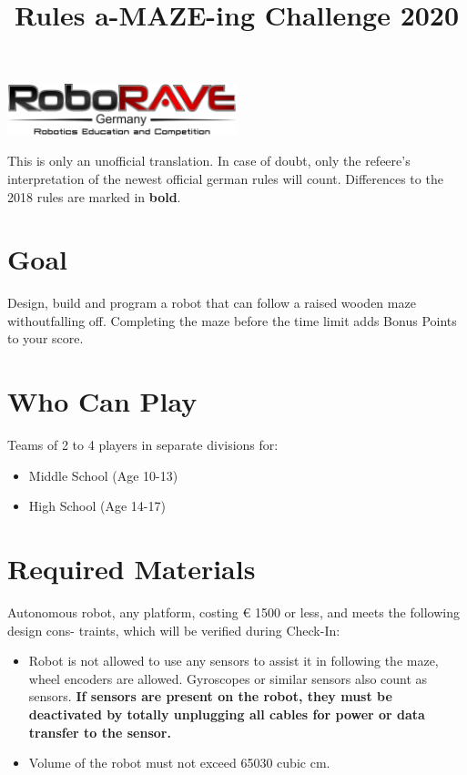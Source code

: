 \documentclass[a4paper,12pt]{article}
\begin{document}
\title{Rules a-MAZE-ing Challenge 2020}
\makeatletter
\let\inserttitle\@title
\makeatother
 \begin{center}
\includegraphics[width=0.5\textwidth]{logo.png}

\huge                      %
\bfseries                   %
\inserttitle
  \end{center}
This is only an unofficial translation. In case of doubt, only the refeere's interpretation of the newest
official german rules will count. Differences to the 2018 rules are marked in \textbf{bold}.

\section{Goal}
Design, build and program a robot that can follow a raised wooden maze withoutfalling
off. Completing the maze before the time limit adds Bonus Points to your score.

\section{Who Can Play}
Teams of 2 to 4 players in separate divisions for:
\begin{itemize}
	\item Middle School (Age 10-13)
	\item High School (Age 14-17)
\end{itemize}

\section{Required Materials}
Autonomous robot, any platform, costing \euro{ 1500} or less, and meets the following design cons-
traints, which will be verified during Check-In:
\begin{itemize}
\item Robot is not allowed to use any sensors to assist it in following the maze, wheel encoders
are allowed. Gyroscopes or similar sensors also count as sensors.
\textbf{If sensors are present on the robot, they must be deactivated by totally unplugging all
cables for power or data transfer to the sensor.}
\item Volume of the robot must not exceed 65030 cubic cm.
\end{itemize}
\end{document}
